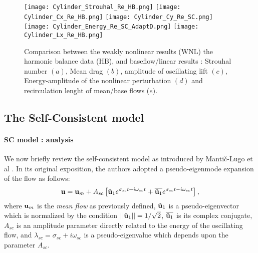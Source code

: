 \documentclass[twocolumn,10pt]{asme2ej}
\newcommand{\be}[1]{ \begin{equation} \label{#1}}
\newcommand{\ee}{\end{equation}}
\begin{document}
\begin{figure}
\begin{center}
\texttt{[image: Cylinder\_Strouhal\_Re\_HB.png]}
\texttt{[image: Cylinder\_Cx\_Re\_HB.png]}
\texttt{[image: Cylinder\_Cy\_Re\_SC.png]}
\texttt{[image: Cylinder\_Energy\_Re\_SC\_AdaptD.png]}
\texttt{[image: Cylinder\_Lx\_Re\_HB.png]}
\end{center}
\caption{Comparison between the weakly nonlinear results (WNL) the harmonic balance data (HB), and baseflow/linear results : Strouhal number $(a)$, Mean drag $(b)$, amplitude of oscillating lift $(c)$, Energy-amplitude of the nonlinear perturbation $(d)$ and recirculation lenght of mean/base flows ($e)$. 
}
\label{fig:HB_SC_DATA_COMP}
\end{figure}



\subsection{The Self-Consistent model  }
\paragraph{SC model : analysis }



We now briefly review the self-consistent model as introduced by Manti\v{c}-Lugo et 
al \cite{MLugo2014}. In its original exposition, the authors adopted a pseudo-eigenmode expansion of the flow 
as follows: 
\be{SC}
{\bf u } = {\bf u }_m + A_{sc} \left[ \tilde{{\bf u }}_1 e^{\sigma_{sc} t + i \omega_{sc} t} +   \overline{\tilde{\bf u }_1} e^{\sigma_{sc} t  -i \omega_{sc} t} \right],
\ee  
where ${\bf u }_m$ is the {\em mean flow} as previously defined,  $\tilde{{\bf u }}_1$ is a pseudo-eigenvector which is normalized by the condition  $||\tilde{{\bf u }}_1|| = 1/\sqrt{2}$, $\overline{\tilde{{\bf u }}_1}$ is its complex conjugate,
$A_{sc}$ is an amplitude parameter directly related to the energy of the oscillating flow, and $\lambda_{sc} = \sigma_{sc} + i \omega_{sc}$ is a pseudo-eigenvalue which depends upon the parameter $A_{sc}$. 
\end{document}
